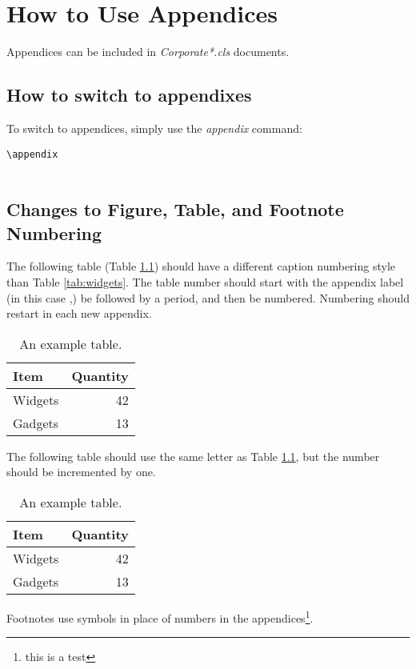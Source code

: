 \chapter{How to Use Appendices}
Appendices can be included in \emph{Corporate*.cls} documents. 

\section{How to switch to appendixes}
To switch to appendices, simply use the \emph{appendix} command:

\begin{lstlisting}
\appendix


\end{lstlisting}

\section{Changes to Figure, Table, and Footnote Numbering}
The following table (Table \ref{tab:AppAWidgets}) should have a different caption numbering style than Table \ref{tab:widgets}. The table number should start with the appendix label (in this case \thechapter,) be followed by a period, and then be numbered. Numbering should restart in each new appendix.

\begin{table}[!h]
\centering
\caption{An example table.}\label{tab:AppAWidgets}
\begin{tabular}{lr}
Item & Quantity \\
\hline
Widgets & 42 \\
Gadgets & 13
\end{tabular}
\end{table}

The following table should use the same letter as Table \ref{tab:AppAWidgets}, but the number should be incremented by one.

\begin{table}[!h]
\centering
\caption{An example table.}\label{tab:AppAWidgetsTwo}
\begin{tabular}{lr}
Item & Quantity \\
\hline
Widgets & 42 \\
Gadgets & 13
\end{tabular}
\end{table}

Footnotes use symbols in place of numbers in the appendices\footnote{this is a test}.